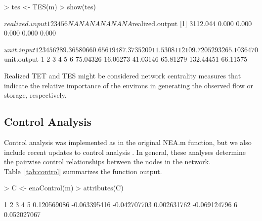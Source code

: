 \documentclass[article]{jss}
\begin{document}
\begin{Schunk}
\begin{Sinput}
> tes <- TES(m)
> show(tes)
\end{Sinput}
\begin{Soutput}
$realized.input
 1  2  3  4  5  6 
NA NA NA NA NA NA 

$realized.output
[1] 3112.044    0.000    0.000    0.000    0.000    0.000

$unit.input
          1           2           3           4           5           6 
289.3658066   0.6561948   7.3735209  11.5308112 109.7205293 265.1036470 

$unit.output
        1         2         3         4         5         6 
 75.04326  16.06273  41.03146  65.81279 132.44451  66.11575 
\end{Soutput}
\end{Schunk}

Realized TET and TES might be considered network centrality measures that
indicate the relative importance of the environs in generating
the observed flow or storage, respectively.

\subsection{Control Analysis}


Control analysis was implemented as in the original NEA.m function,
but we also include recent updates to control analysis
\citep[e.g.,][]{schramski06, schramski07}.  In general, these analyses
determine the pairwise control relationships between the nodes in the
network.  Table~\ref{tab:control} summarizes the function output.

\begin{Schunk}
\begin{Sinput}
> C <- enaControl(m)
> attributes(C)
\end{Sinput}
\begin{Soutput}
           1            2            3            4            5 
 0.120569086 -0.063395416 -0.042707703  0.002631762 -0.069124796 
           6 
 0.052027067 
\end{Soutput}
\end{Schunk}
\end{document}
